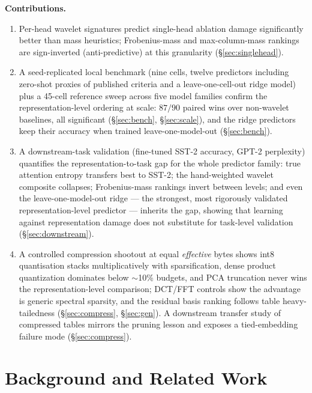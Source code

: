 \documentclass[conference]{IEEEtran}
\begin{document}
\textbf{Contributions.}
\begin{enumerate}
\item Per-head wavelet signatures predict single-head ablation damage
significantly better than mass heuristics; Frobenius-mass and
max-column-mass rankings are sign-inverted (anti-predictive) at this
granularity (\S\ref{sec:singlehead}).
\item A seed-replicated local benchmark (nine cells, twelve predictors
including zero-shot proxies of published criteria and a
leave-one-cell-out ridge model) plus
a 45-cell reference sweep across five model families confirm the
representation-level ordering at scale: $87/90$ paired wins over
non-wavelet baselines, all significant (\S\ref{sec:bench},
\S\ref{sec:scale}), and the ridge predictors keep their accuracy when
trained leave-one-model-out (\S\ref{sec:bench}).
\item A downstream-task validation (fine-tuned SST-2 accuracy, GPT-2
perplexity) quantifies the representation-to-task gap for the whole
predictor family: true attention entropy transfers best to SST-2; the
hand-weighted wavelet composite collapses; Frobenius-mass rankings
invert between levels; and even the leave-one-model-out ridge --- the
strongest, most rigorously validated representation-level predictor ---
inherits the gap, showing that learning against representation damage
does not substitute for task-level validation (\S\ref{sec:downstream}).
\item A controlled compression shootout at equal \emph{effective} bytes
shows int8 quantisation stacks multiplicatively with sparsification,
dense product quantization dominates below $\sim$10\% budgets, and PCA
truncation never wins the representation-level comparison; DCT/FFT
controls show the advantage is generic spectral sparsity, and the
residual basis ranking follows table heavy-tailedness
(\S\ref{sec:compress}, \S\ref{sec:gen}). A downstream transfer study of
compressed tables mirrors the pruning lesson and exposes a
tied-embedding failure mode (\S\ref{sec:compress}).
\end{enumerate}

\section{Background and Related Work}
\end{document}
